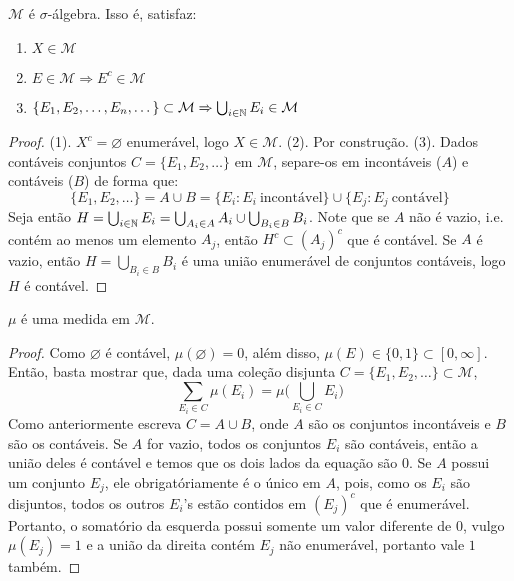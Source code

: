 \begin{problem}
    \label{prob:l1:3}
\end{problem}

\begin{prop}
    $\mathcal{M}$ é $\sigma$-álgebra. Isso é, satisfaz:
    \begin{enumerate}
        \item $X \in \mathcal{M}$
        \item $E \in \mathcal{M} \Rightarrow E^c \in \mathcal{M}$
        \item $\{E_1, E_2, \dots, E_n, \dots\} \subset \mathcal{M} \Rightarrow \bigcup_{i \in \mathbb{N}} E_i \in \mathcal{M}$
    \end{enumerate}
\end{prop}
\begin{proof}
    (1). $X^c = \varnothing$ enumerável, logo $X \in \mathcal{M}$. (2). Por construção. (3). Dados
    contáveis conjuntos $C = \{E_1, E_2, \dots\}$ em $\mathcal{M}$, separe-os em incontáveis ($A$) e contáveis ($B$) de forma que:
    $$\{E_1, E_2, \dots\} = A \cup B =  \{E_i: E_i \ \text{incontável}\} \cup \{E_j: E_j \ \text{contável}\}$$
    Seja então $H = \bigcup_{i \in \mathbb{N}} E_i = \bigcup_{A_i \in A} A_i \cup  \bigcup_{B_i \in B} B_i$. Note que se $A$ não é vazio, i.e. contém
    ao menos um elemento $A_j$, então $H^c \subset (A_j)^c$ que é contável. Se $A$ é vazio, então $H = \bigcup_{B_i \in B} B_i$ é uma união enumerável de conjuntos
    contáveis, logo $H$ é contável.
\end{proof}
\begin{prop}
    $\mu$ é uma medida em $\mathcal{M}$.
\end{prop}
\begin{proof}
    Como $\varnothing$ é contável, $\mu(\varnothing) = 0$, além disso, $\mu(E) \in \{0,1\} \subset [0,\infty]$.
    Então, basta mostrar que, dada uma coleção disjunta $C = \{E_1, E_2, \dots\} \subset \mathcal{M}$,
    $$\sum_{E_i \in C} \mu(E_i) = \mu\big( \bigcup_{E_i \in C} E_i \big) $$
    Como anteriormente escreva $C = A \cup B$, onde $A$ são os conjuntos incontáveis e $B$ são os contáveis.
    Se $A$ for vazio, todos os conjuntos $E_i$ são contáveis, então a união deles é contável e temos 
    que os dois lados da equação são $0$. Se $A$ possui um conjunto $E_j$, ele obrigatóriamente é o único em 
    $A$, pois, como os $E_i$ são disjuntos, todos os outros $E_i$'s estão contidos em $(E_j)^c$ que é enumerável.
    Portanto, o somatório da esquerda possui somente um valor diferente de $0$, vulgo $\mu(E_j) = 1$ e a união
    da direita contém $E_j$ não enumerável, portanto vale $1$ também.
\end{proof}

